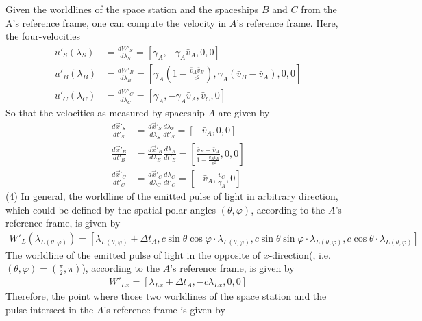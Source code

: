 \documentclass[12pt]{article}
\begin{document}
Given the worldlines of the space station and the spaceships $B$ and $C$ from the A's reference frame, one can compute the velocity in $A$'s reference frame.
Here, the four-velocities
\begin{align*}
u'_S(\lambda_S) &= \frac{d W'_S}{d \lambda_S} = \left[\gamma_A, - \gamma_A \bar{v}_A, 0, 0 \right]\\[1em]
u'_B(\lambda_B) &= \frac{d W'_B}{d \lambda_B} = \left[\gamma_A \left(1 - \frac{\bar{v}_A \bar{v}_B}{c^2}\right), \gamma_A \left( \bar{v}_B - \bar{v}_A\right), 0, 0 \right]\\[1em]
u'_C(\lambda_C) &= \frac{d W'_C}{d \lambda_C} = \left[\gamma_A, - \gamma_A \bar{v}_A, \bar{v}_C, 0 \right]
\end{align*}
So that the velocities as measured by spaceship $A$ are given by
\begin{align*}
\frac{d \Vec{x}'_S}{d t'_S} &= \frac{d \Vec{x}'_S}{d \lambda_S} \frac{d \lambda_S}{d t'_S} = \left[-\bar{v}_A, 0, 0 \right]\\[1em]
\frac{d \Vec{x}'_B}{d t'_B} &= \frac{d \Vec{x}'_B}{d \lambda_B} \frac{d \lambda_B}{d t'_B} = \left[\frac{\bar{v}_B - \bar{v}_A}{1 - \frac{\bar{v}_A \bar{v}_B}{c^2}}, 0, 0 \right]\\[1em]
\frac{d \Vec{x}'_C}{d t'_C} &= \frac{d \Vec{x}'_C}{d \lambda_C} \frac{d \lambda_C}{d t'_C} = \left[-\bar{v}_A, \frac{\bar{v}_C}{\gamma_A}, 0 \right]
\end{align*}
(4)
In general, the worldline of the emitted pulse of light in arbitrary direction, which could be defined by the spatial polar angles $(\theta, \varphi)$, according to the $A$'s reference frame, is given by
\begin{gather*}
W'_{L}(\lambda_{L(\theta,\varphi)}) = \left[\lambda_{L(\theta,\varphi)} + \Delta t_A, c \sin{\theta} \cos{\varphi} \cdot \lambda_{L(\theta,\varphi)}, c \sin{\theta} \sin{\varphi} \cdot \lambda_{L(\theta,\varphi)}, c \cos{\theta} \cdot \lambda_{L(\theta,\varphi)} \right]
\end{gather*}
The worldline of the emitted pulse of light in the opposite of $x$-direction(, i.e. $(\theta, \varphi) = (\frac{\pi}{2}, \pi)$), according to the $A$'s reference frame, is given by
\begin{gather*}
W'_{Lx} = \left[\lambda_{Lx} + \Delta t_A, -c \lambda_{Lx}, 0, 0 \right]
\end{gather*}
Therefore, the point where those two worldlines of the space station and the pulse intersect in the $A$'s reference frame is given by
\end{document}
